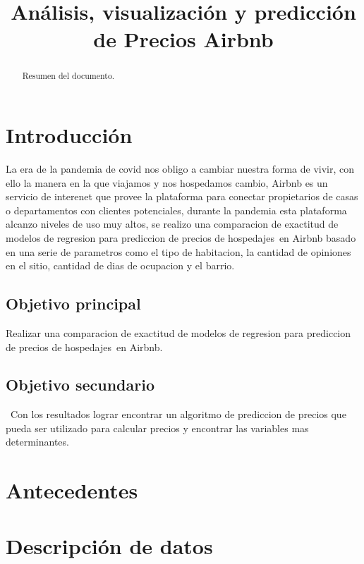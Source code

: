 \documentclass[conference]{IEEEtran}
\begin{document}
\title{Análisis, visualización y predicción de Precios Airbnb}

\author{%
}

\maketitle

\begin{abstract}
Resumen del documento.
\end{abstract}

\section{Introducción}
La era de la pandemia de covid nos obligo a cambiar nuestra forma de vivir, con ello la manera en la que viajamos y nos hospedamos cambio, Airbnb es un servicio de interenet que provee la plataforma para conectar propietarios de casas o departamentos con clientes potenciales, durante la pandemia esta plataforma alcanzo niveles de uso muy altos, se realizo una comparacion de exactitud de modelos de regresion para prediccion de precios de hospedajes en Airbnb basado en una serie de parametros como el tipo de habitacion, la cantidad de opiniones en el sitio, cantidad de dias de ocupacion y el barrio.

\subsection{Objetivo principal}
Realizar una comparacion de exactitud de modelos de regresion para prediccion de precios de hospedajes en Airbnb.
\subsection{Objetivo secundario}
 Con los resultados lograr encontrar un algoritmo de prediccion de precios que pueda ser utilizado para calcular precios y encontrar las variables mas determinantes.

\section{Antecedentes}


\section{Descripción de datos}
\end{document}
